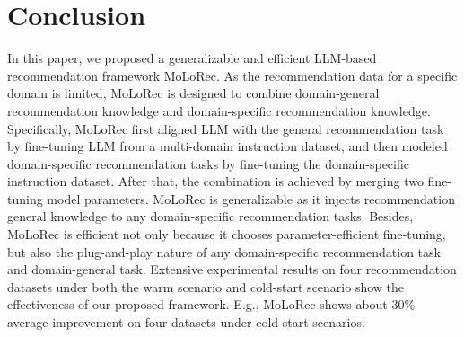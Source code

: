 \vspace{-0.1cm}
\section{Conclusion}
In this paper, we proposed a generalizable and efficient LLM-based recommendation framework MoLoRec. As the recommendation data for a specific domain is limited, MoLoRec is designed to combine domain-general recommendation knowledge and domain-specific recommendation knowledge. Specifically, MoLoRec first aligned LLM with the general recommendation task by fine-tuning LLM from a multi-domain instruction dataset, and then modeled domain-specific recommendation tasks by fine-tuning the domain-specific instruction dataset. After that, the combination is achieved by merging two fine-tuning model parameters. MoLoRec is generalizable as it injects recommendation general knowledge to any domain-specific recommendation tasks. Besides, MoLoRec is efficient not only because it chooses parameter-efficient fine-tuning, but also the plug-and-play nature of any domain-specific recommendation task and domain-general task. Extensive experimental results on four recommendation datasets under both the warm scenario and cold-start scenario show the effectiveness of our proposed framework. E.g., MoLoRec shows about 30\% average improvement on four datasets under cold-start scenarios. 



